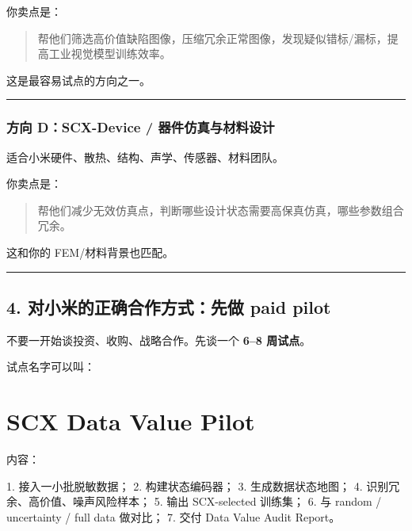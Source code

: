 \documentclass[
  12pt,
]{ctexart}
\newenvironment{Shaded}{}{}
\newcommand{\NormalTok}[1]{#1}
\begin{document}
你卖点是：

\begin{quote}
帮他们筛选高价值缺陷图像，压缩冗余正常图像，发现疑似错标/漏标，提高工业视觉模型训练效率。
\end{quote}

这是最容易试点的方向之一。

\begin{center}\rule{0.5\linewidth}{0.5pt}\end{center}

\subsubsection{方向 D：SCX-Device /
器件仿真与材料设计}\label{ux65b9ux5411-dscx-device-ux5668ux4ef6ux4effux771fux4e0eux6750ux6599ux8bbeux8ba1}

适合小米硬件、散热、结构、声学、传感器、材料团队。

你卖点是：

\begin{quote}
帮他们减少无效仿真点，判断哪些设计状态需要高保真仿真，哪些参数组合冗余。
\end{quote}

这和你的 FEM/材料背景也匹配。

\begin{center}\rule{0.5\linewidth}{0.5pt}\end{center}

\subsection{4. 对小米的正确合作方式：先做 paid
pilot}\label{ux5bf9ux5c0fux7c73ux7684ux6b63ux786eux5408ux4f5cux65b9ux5f0fux5148ux505a-paid-pilot}

不要一开始谈投资、收购、战略合作。先谈一个 \textbf{6--8 周试点}。

试点名字可以叫：

\section{SCX Data Value Pilot}\label{scx-data-value-pilot}

内容：

\begin{Shaded}
\begin{Highlighting}[]
\NormalTok{1. 接入一小批脱敏数据；}
\NormalTok{2. 构建状态编码器；}
\NormalTok{3. 生成数据状态地图；}
\NormalTok{4. 识别冗余、高价值、噪声风险样本；}
\NormalTok{5. 输出 SCX{-}selected 训练集；}
\NormalTok{6. 与 random / uncertainty / full data 做对比；}
\NormalTok{7. 交付 Data Value Audit Report。}
\end{Highlighting}
\end{Shaded}
\end{document}
